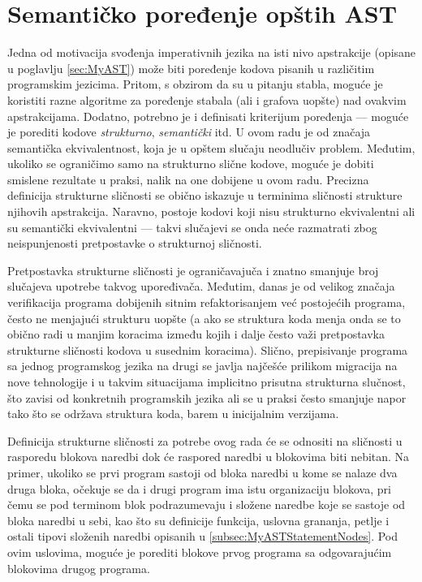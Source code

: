 \chapter{Semantičko poređenje opštih AST}
\label{chp:ASTComparing}

Jedna od motivacija svođenja imperativnih jezika na isti nivo apstrakcije (opisane u poglavlju \ref{sec:MyAST}) može biti poređenje kodova pisanih u različitim programskim jezicima. Pritom, s obzirom da su u pitanju stabla, moguće je koristiti razne algoritme za poređenje stabala (ali i grafova uopšte) nad ovakvim apstrakcijama. Dodatno, potrebno je i definisati kriterijum poređenja --- moguće je porediti kodove \emph{strukturno}, \emph{semantički} itd. U ovom radu je od značaja semantička ekvivalentnost, koja je u opštem slučaju neodlučiv problem. Međutim, ukoliko se ograničimo samo na strukturno slične kodove, moguće je dobiti smislene rezultate u praksi, nalik na one dobijene u ovom radu. Precizna definicija strukturne sličnosti se obično iskazuje u terminima sličnosti strukture njihovih apstrakcija. Naravno, postoje kodovi koji nisu strukturno ekvivalentni ali su semantički ekvivalentni --- takvi slučajevi se onda neće razmatrati zbog neispunjenosti pretpostavke o strukturnoj sličnosti. 

Pretpostavka strukturne sličnosti je ograničavajuča i znatno smanjuje broj slučajeva upotrebe takvog upoređivača. Međutim, danas je od velikog značaja verifikacija programa dobijenih sitnim refaktorisanjem već postojećih programa, često ne menjajući strukturu uopšte (a ako se struktura koda menja onda se to obično radi u manjim koracima između kojih i dalje često važi pretpostavka strukturne sličnosti kodova u susednim koracima). Slično, prepisivanje programa sa jednog programskog jezika na drugi se javlja najčešće prilikom migracija na nove tehnologije i u takvim situacijama implicitno prisutna strukturna slučnost, što zavisi od konkretnih programskih jezika ali se u praksi često smanjuje napor tako što se održava struktura koda, barem u inicijalnim verzijama. 

Definicija strukturne sličnosti za potrebe ovog rada će se odnositi na sličnosti u rasporedu blokova naredbi dok će raspored naredbi u blokovima biti nebitan. Na primer, ukoliko se prvi program sastoji od bloka naredbi u kome se nalaze dva druga bloka, očekuje se da i drugi program ima istu organizaciju blokova, pri čemu se pod terminom blok podrazumevaju i složene naredbe koje se sastoje od bloka naredbi u sebi, kao što su definicije funkcija, uslovna grananja, petlje i ostali tipovi složenih naredbi opisanih u \ref{subsec:MyASTStatementNodes}. Pod ovim uslovima, moguće je porediti blokove prvog programa sa odgovarajućim blokovima drugog programa.




